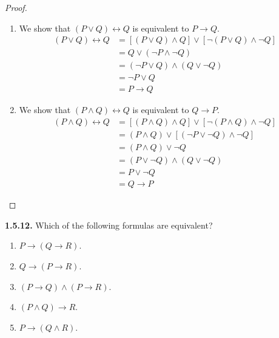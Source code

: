 \documentclass[12pt]{amsart}
\newenvironment{statement}[1]{\smallskip\noindent\color[rgb]{.6627, .3529, .6314} {\bf #1.}}{}
\theoremstyle{definition}
\theoremstyle{remark}
\begin{document}
\begin{proof}
\hfill
\begin{enumerate}
	\item We show that $(P \vee Q) \leftrightarrow Q$ is equivalent to $P \rightarrow Q$.
	\begin{align*}
		(P \vee Q) \leftrightarrow Q
		&= [(P \vee Q) \wedge Q] \vee [\neg (P \vee Q) \wedge \neg Q] \\
		&= Q \vee (\neg P \wedge \neg Q) \\
		&= (\neg P \vee Q) \wedge (Q \vee \neg Q) \\
		&= \neg P \vee Q \\
		&= P \rightarrow Q
	\end{align*}
	
	\item We show that $(P \wedge Q) \leftrightarrow Q$ is equivalent to $Q \rightarrow P$.
	\begin{align*}
		(P \wedge Q) \leftrightarrow Q
		&= [(P \wedge Q) \wedge Q] \vee [\neg (P \wedge Q) \wedge \neg Q] \\
		&= (P \wedge Q) \vee [(\neg P \vee \neg Q) \wedge \neg Q] \\
		&= (P \wedge Q) \vee \neg Q \\
		&= (P \vee \neg Q) \wedge (Q \vee \neg Q) \\
		&= P \vee \neg Q \\
		&= Q \rightarrow P
	\end{align*}
\end{enumerate}
\end{proof}


\begin{statement}{1.5.12}
Which of the following formulas are equivalent?
\begin{enumerate}
	\item $P \rightarrow (Q \rightarrow R)$.
	\item $Q \rightarrow (P \rightarrow R)$.
	\item $(P \rightarrow Q) \wedge (P \rightarrow R)$.
	\item $(P \wedge Q) \rightarrow R$.
	\item $P \rightarrow (Q \wedge R)$.
\end{enumerate}
\end{statement}
\end{document}

